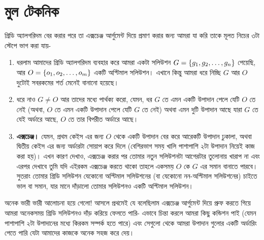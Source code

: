 \section{মুল টেকনিক}

গ্রিডি অ্যালগরিদম বের করার পরে তা এক্সচেঞ্জ আর্গুমেন্ট দিয়ে প্রমাণ করার জন্য আমরা যা করি তাকে মূলত নিচের ৩টা স্টেপে ভাগ করা যায়-
\begin{enumerate}
	\item ধরলাম আমাদের গ্রিডি অ্যালগরিদম ব্যবহার করে আমরা একটা সলিউশন $G = \left \{ g_1, g_2, \ldots, g_n \right \}$ পেয়েছি, আর $O = \left \{ o_1, o_2, \ldots, o_m \right \}$ একটি অপ্টিমাল সলিউশন।  এখানে কিন্তু আমরা ধরে নিচ্ছি $G$ আর $O$ দুটোই সবরকমের শর্ত মেনেই বানানো হয়েছে।
	\item ধরে নাও $G \not= O$ আর  তাদের মধ্যে পার্থক্য করো, যেমন, ধর $G$ তে এমন একটি উপাদান পেলে যেটি $O$ তে নেই (অথবা, $O$ তে এমন একটি উপাদান পেলে যেটি $G$ তে নেই) অথবা এমন দুটি উপাদান আছে যারা $G$ তে যেই অর্ডারে আছে, $O$ তে তার বিপরীত অর্ডারে আছে।
	\item \textbf{এক্সচেঞ্জ।} যেমন, প্রথম কেইস এর জন্য $O$ থেকে একটি উপাদান বের করে আরেকটি উপাদান ঢুকালা, অথবা দ্বিতীয় কেইস এর জন্য অর্ডারটা সোয়াপ করে দিলে (বেশিরভাগ সময় খালি পাশাপাশি ২টা উপাদান নিয়েই কাজ করা হয়)। এখন কারণ দেখাও, এক্সচেঞ্জ করার পর তোমার নতুন সলিউশনটা আগেরটার তুলোনায় খারাপ না এবং এরপর দেখাবে তুমি যদি এইরকম এক্সচেঞ্জ করতে থাকো তাহলে একসময় $O$ কে $G$ এর সমান বানাতে পারবে। সুতরাং তোমার গ্রিডি সলিউশন যেকোনো অপ্টিমাল সলিউশনের (বা যেকোনো নন-অপ্টিমাল সলিউশনের) চাইতে ভাল বা সমান, যার মানে দাঁড়ালো তোমার সলিউশনও একটি অপ্টিমাল সলিউশন।
\end{enumerate}

অনেক ভারী ভারী আলোচনা হয়ে গেলো! আসলে প্রথমেই যে বলেছিলাম এক্সচেঞ্জ আর্গুমেন্ট দিয়ে প্রুফ করতে গিয়ে আমরা অনেকসময় গ্রিডি সলিউশনও দাঁড় করিয়ে ফেলতে পারি- এভাবে চিন্তা করলে আমরা কিছু কন্ডিশন পাই (যেমন পাশাপাশি ২টা উপাদানের মধ্যে কিরকম সম্পর্ক হতে পারে) এবং সেগুলো থেকে আমরা উপাদান গুলোর একটি অর্ডারিং পেতে পারি যেটা আমাদের কাজকে অনেক সহজ করে দেয়।
